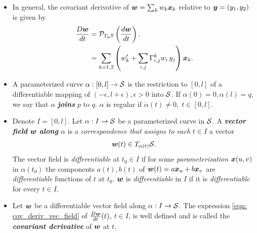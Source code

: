 \documentclass[11pt]{article}
\begin{document}
\begin{itemize}
\item In general, the covariant derivative of $\boldsymbol{w} = \sum_{k}w_{k}\boldsymbol{x}_{k}$ relative to $\boldsymbol{y} = (y_{1}, y_{2})$ is given by 
\begin{align}
\frac{D\boldsymbol{w}}{dt} &= \mathcal{P}_{T_{p}S}\left(\frac{d\boldsymbol{w}}{dt} \right). \label{eqn: covariant_derivative_projection}\\
&= \sum_{k=1,2}\left(w_{k}' + \sum_{i,j}\Gamma_{i,j}^{k} w_{i}\,y_{j} \right) \boldsymbol{x}_{k}.  \label{eqn: covariant_derivative_projection_christoffel}
\end{align}


\item \begin{definition}
A parameterized curve $\alpha: [0, l] \rightarrow {\mathcal S}$ is the restriction to $[0,l]$ of a differentiable mapping of $(-\epsilon, l+\epsilon), \epsilon>0$ into ${\mathcal S}$. If $\alpha(0) = 0, \alpha(l) = q$, we say that $\alpha$ \emph{\textbf{joins}} $p$ to $q$. $\alpha$ is regular if $\dot{\alpha}(t)\neq 0, \;t\in [0,l]$.
\end{definition}

\item \begin{definition}
Denote $I= [0,l]$. Let $\alpha: I\rightarrow {\mathcal S} $ be a parameterized curve in ${\mathcal S}$. A \emph{\textbf{vector field} $\boldsymbol{w}$ \textbf{along} $\alpha$} is a \emph{correspondence that assigns to each} $t\in I$ a vector 
\begin{align*}
\boldsymbol{w}(t) \in T_{\alpha(t)}{\mathcal S}.
\end{align*}
The vector field is \emph{differentiable} at $t_{0}\in I$ if for some \emph{parameterization} $\boldsymbol{x}(u,v)$ in $\alpha(t_{0})$ the components $a(t), b(t)$ of $\boldsymbol{w}(t) = a\boldsymbol{x}_{u} + b\boldsymbol{x}_{v}$ are \emph{differentiable} functions of $t$ at $t_{0}$. $\boldsymbol{w}$ is \emph{differentiable} in $I$ if it is \emph{differentiable} for every $t\in I$.
\end{definition}

\item \begin{definition}
Let $\boldsymbol{w}$ be a differentiable vector field along $\alpha: I \rightarrow {\mathcal S}$. The expression \eqref{eqn: cov_deriv_vec_field} of $\frac{D\boldsymbol{w}}{dt}(t)$, $t \in I$, is well defined and is called the \emph{\textbf{covariant derivative}} of $\boldsymbol{w}$ at $t$.
\end{definition}


\end{itemize}
\end{document}
